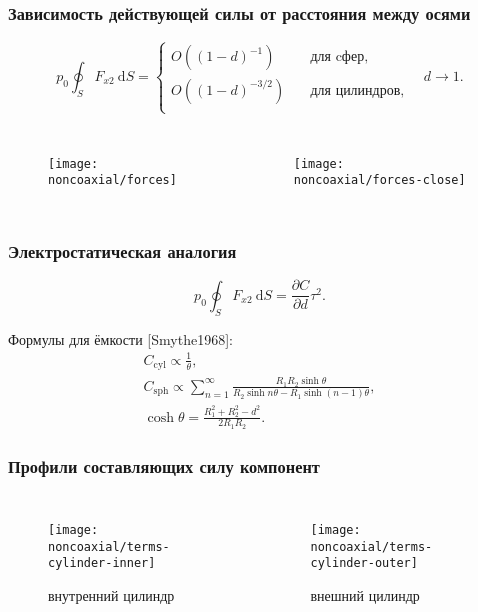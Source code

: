 \documentclass[mathserif]{beamer} %
\newcommand{\dd}{\:\mathrm{d}}
\newcommand{\pder}[2][]{\frac{\partial#1}{\partial#2}}
\newcommand{\OO}[1]{O(#1)}
\begin{document}
\begin{frame}
    \frametitle{Зависимость действующей силы от расстояния между осями}
    \vspace{-.5cm}
    \[ p_0 \oint_S F_{x2}\dd{S} = \begin{cases}
        \OO{(1-d)^{-1}} & \quad\text{для cфер}, \\
        \OO{(1-d)^{-3/2}} & \quad\text{для цилиндров}, \\
        \end{cases} \quad d\to1. \]
    \vspace{-.7cm}
    \begin{columns}
        \begin{figure}
            \texttt{[image: noncoaxial/forces]}
        \end{figure}
        \begin{figure}
            \texttt{[image: noncoaxial/forces-close]}
        \end{figure}
    \end{columns}
\end{frame}

\begin{frame}
    \frametitle{Электростатическая аналогия}
    \begin{equation}
        p_0\oint_S F_{x2}\dd{S} = \pder[C]{d} \tau^2.
    \end{equation}
    \pause
    \vspace{10pt}

    Формулы для ёмкости [Smythe1968]:
    \begin{gather}
        C_\mathrm{cyl} \propto \frac1{\theta}, \\
        C_\mathrm{sph} \propto  \sum_{n=1}^\infty \frac{R_1 R_2 \sinh\theta} {R_2\sinh n\theta - R_1\sinh (n-1)\theta}, \\
        \cosh\theta = \frac{R_1^2 + R_2^2 - d^2}{2 R_1 R_2}.
    \end{gather}
\end{frame}


\begin{frame}
    \frametitle{Профили составляющих силу компонент}
    \begin{columns}
        \begin{figure}
            \texttt{[image: noncoaxial/terms-cylinder-inner]}
            \vspace{-.5cm}\caption{внутренний цилиндр}
        \end{figure}
        \begin{figure}
            \texttt{[image: noncoaxial/terms-cylinder-outer]}
            \vspace{-.5cm}\caption{внешний цилиндр}
        \end{figure}
    \end{columns}
\end{frame}
\end{document}
